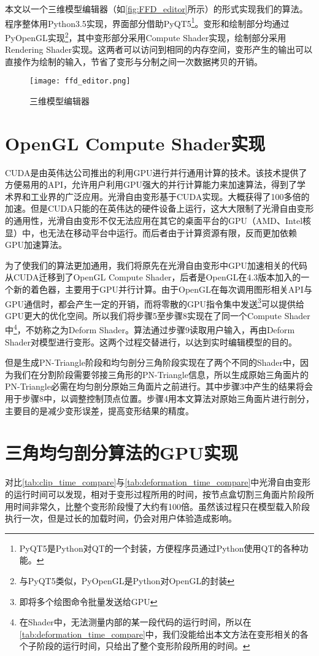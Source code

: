 本文以一个三维模型编辑器（如\autoref{fig:FFD_editor}所示）的形式实现我们的算法。程序整体用Python3.5实现，界面部分借助PyQT5\footnote{PyQT5是Python对QT的一个封装，方便程序员通过Python使用QT的各种功能。}。变形和绘制部分均通过PyOpenGL实现\footnote{与PyQT5类似，PyOpenGL是Python对OpenGL的封装}，其中变形部分采用Compute Shader实现，绘制部分采用Rendering Shader实现。这两者可以访问到相同的内存空间，变形产生的输出可以直接作为绘制的输入，节省了变形与分制之间一次数据拷贝的开销。


\begin{figure}[htbp]
	\centering
	\texttt{[image: ffd\_editor.png]}
	\caption{三维模型编辑器}\label{fig:FFD_editor}
\end{figure}


\section{OpenGL Compute Shader实现}
CUDA是由英伟达公司推出的利用GPU进行并行通用计算的技术。该技术提供了方便易用的API，允许用户利用GPU强大的并行计算能力来加速算法，得到了学术界和工业界的广泛应用。光滑自由变形\cite{Cui15}基于CUDA实现。大概获得了100多倍的加速。但是CUDA只能的在英伟达的硬件设备上运行，这大大限制了光滑自由变形的通用性，光滑自由变形不仅无法应用在其它的桌面平台的GPU（AMD、Intel核显）中，也无法在移动平台中运行。而后者由于计算资源有限，反而更加依赖GPU加速算法。

为了使我们的算法更加通用，我们将原先在光滑自由变形中GPU加速相关的代码从CUDA迁移到了OpenGL Compute Shader，后者是OpenGL在4.3版本加入的一个新的着色器，主要用于GPU并行计算。由于OpenGL在每次调用图形相关API与GPU通信时，都会产生一定的开销，而将零散的GPU指令集中发送\footnote{即将多个绘图命令批量发送给GPU}可以提供给GPU更大的优化空间。所以我们将步骤5至步骤8实现在了同一个Compute Shader中\footnote{在Shader中，无法测量内部的某一段代码的运行时间，所以在\autoref{tab:deformation_time_compare}中，我们没能给出本文方法在变形相关的各个子阶段的运行时间，只给出了整个变形阶段所用的时间。}，不妨称之为Deform Shader。算法通过步骤9读取用户输入，再由Deform Shader对模型进行变形。这两个过程交替进行，以达到实时编辑模型的目的。

但是生成PN-Triangle阶段和均匀剖分三角阶段实现在了两个不同的Shader中，因为我们在分割阶段需要邻接三角形的PN-Triangle信息，所以生成原始三角面片的PN-Triangle必需在均匀剖分原始三角面片之前进行。其中步骤3中产生的结果将会用于步骤8中，以调整控制顶点位置。步骤4用本文算法对原始三角面片进行剖分，主要目的是减少变形误差，提高变形结果的精度。


\section{三角均匀剖分算法的GPU实现}
    对比\autoref{tab:clip_time_compare}与\autoref{tab:deformation_time_compare}中光滑自由变形的运行时间可以发现，相对于变形过程所用的时间，按节点盒切割三角面片阶段所用时间非常久，比整个变形阶段慢了大约有100倍。虽然该过程只在模型载入阶段执行一次，但是过长的加载时间，仍会对用户体验造成影响。

